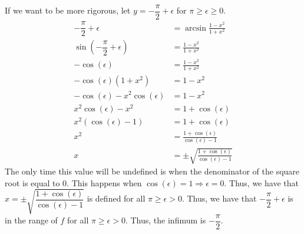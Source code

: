 \documentclass{article}%
\begin{document}
\begin{center}
\begin{enumerate}
\begin{enumerate}
        If we want to be more rigorous, let $y = -\dfrac{\pi}{2} + \epsilon$ for $\pi \geq \epsilon \geq 0$.
        \begin{align*}
            -\dfrac{\pi}{2} + \epsilon &= \arcsin \frac{1-x^2}{1+x^2} \\
            \sin\left(-\dfrac{\pi}{2} + \epsilon\right) &= \frac{1-x^2}{1+x^2} \\
            -\cos(\epsilon) &= \frac{1-x^2}{1+x^2} \\
            -\cos(\epsilon)(1+x^2) &= 1-x^2 \\
            -\cos(\epsilon) - x^2\cos(\epsilon) &= 1-x^2 \\
            x^2\cos(\epsilon) - x^2 &= 1 + \cos(\epsilon) \\
            x^2(\cos(\epsilon) - 1) &= 1 + \cos(\epsilon) \\
            x^2 &= \frac{1 + \cos(\epsilon)}{\cos(\epsilon) - 1} \\
            x &= \pm \sqrt{\frac{1 + \cos(\epsilon)}{\cos(\epsilon) - 1}}
        \end{align*}
        The only time this value will be undefined is when the denominator of the square root is equal to 0. This happens when $\cos(\epsilon) = 1 \Rightarrow \epsilon = 0$. Thus, we have that $x = \pm \sqrt{\dfrac{1 + \cos(\epsilon)}{\cos(\epsilon) - 1}}$ is defined for all $\pi \geq \epsilon > 0$. Thus, we have that $-\dfrac{\pi}{2} + \epsilon$ is in the range of $f$ for all $\pi \geq \epsilon > 0$. Thus, the infimum is $-\dfrac{\pi}{2}$.
    \end{enumerate}
\end{enumerate}
\end{center}
\end{document}
